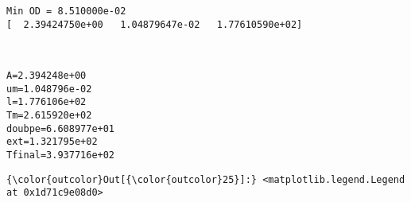 \documentclass[11pt]{article}
\begin{document}
    \begin{Verbatim}[commandchars=\\\{\}]
Min OD = 8.510000e-02
[  2.39424750e+00   1.04879647e-02   1.77610590e+02]

    \end{Verbatim}

    \begin{center}
    \end{center}
    { \hspace*{\fill} \\}
    
    \begin{Verbatim}[commandchars=\\\{\}]
A=2.394248e+00
um=1.048796e-02
l=1.776106e+02
Tm=2.615920e+02
doubpe=6.608977e+01
ext=1.321795e+02
Tfinal=3.937716e+02

    \end{Verbatim}

            \begin{Verbatim}[commandchars=\\\{\}]
{\color{outcolor}Out[{\color{outcolor}25}]:} <matplotlib.legend.Legend at 0x1d71c9e08d0>
\end{Verbatim}
        
    \begin{center}
    \end{center}
    { \hspace*{\fill} \\}
    
    \begin{center}
    \end{center}
    { \hspace*{\fill} \\}
    
\end{document}
